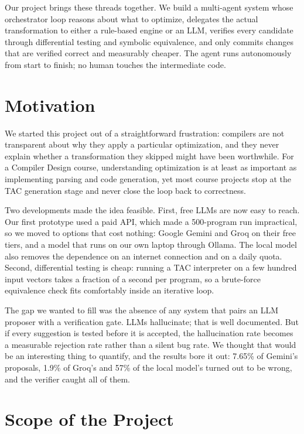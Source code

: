 \documentclass[12pt,a4paper]{report}
\begin{document}
Our project brings these threads together. We build a multi-agent system whose orchestrator loop reasons about what to optimize, delegates the actual transformation to either a rule-based engine or an LLM, verifies every candidate through differential testing and symbolic equivalence, and only commits changes that are verified correct and measurably cheaper. The agent runs autonomously from start to finish; no human touches the intermediate code.

\section{Motivation}

We started this project out of a straightforward frustration: compilers are not transparent about why they apply a particular optimization, and they never explain whether a transformation they skipped might have been worthwhile. For a Compiler Design course, understanding optimization is at least as important as implementing parsing and code generation, yet most course projects stop at the TAC generation stage and never close the loop back to correctness.

Two developments made the idea feasible. First, free LLMs are now easy to reach. Our first prototype used a paid API, which made a 500-program run impractical, so we moved to options that cost nothing: Google Gemini and Groq on their free tiers, and a model that runs on our own laptop through Ollama. The local model also removes the dependence on an internet connection and on a daily quota. Second, differential testing is cheap: running a TAC interpreter on a few hundred input vectors takes a fraction of a second per program, so a brute-force equivalence check fits comfortably inside an iterative loop.

The gap we wanted to fill was the absence of any system that pairs an LLM proposer with a verification gate. LLMs hallucinate; that is well documented. But if every suggestion is tested before it is accepted, the hallucination rate becomes a measurable rejection rate rather than a silent bug rate. We thought that would be an interesting thing to quantify, and the results bore it out: 7.65\% of Gemini's proposals, 1.9\% of Groq's and 57\% of the local model's turned out to be wrong, and the verifier caught all of them.

\section{Scope of the Project}
\end{document}
